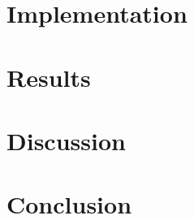 \documentclass[12pt]{article}
\begin{document}
\newpage
\section{Implementation}


\newpage
\section{Results}


\newpage
\section{Discussion}


\newpage
\section{Conclusion}


\newpage
\printbibliography
\end{document}
